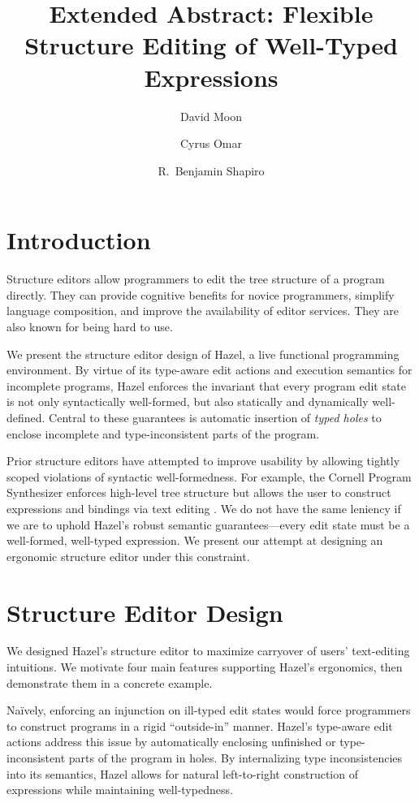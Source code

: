\documentclass[format=sigplan,dvipsnames,backend=bibtex]{acmart}
\title{Extended Abstract: Flexible Structure Editing of Well-Typed Expressions}
\author{David Moon}
\affiliation{University of Colorado Boulder}
\author{Cyrus Omar}
\affiliation{University of Chicago}
\author{R.~Benjamin Shapiro}
\affiliation{University of Colorado Boulder}
\newcommand{\Hazel}{\textsf{Hazel}\xspace}
\begin{document}
\maketitle

\section{Introduction}

Structure editors allow programmers to edit the tree structure of a program directly.
They can provide cognitive benefits for novice programmers, simplify language composition,
  and improve the availability of editor services.
They are also known for being hard to use.

We present the structure editor design of \Hazel, a live functional programming environment.
By virtue of its type-aware edit actions and execution semantics for incomplete programs, 
	\Hazel enforces the invariant that every program edit state is not only syntactically 
	well-formed, but also statically \cite{Hazelnut} and dynamically \cite{HazelnutLive}
	well-defined.
Central to these guarantees is automatic insertion of \emph{typed holes} to enclose
	incomplete and type-inconsistent parts of the program.
	
Prior structure editors have attempted to improve usability by allowing tightly scoped 
	violations of syntactic well-formedness.
For example, the Cornell Program Synthesizer enforces high-level tree structure but
	allows the user to construct expressions and bindings via text editing \cite{Cornell}.
We do not have the same leniency if we are to uphold \Hazel's robust semantic
	guarantees---every edit state must be a well-formed, well-typed expression.
We present our attempt at designing an ergonomic structure editor under this constraint.
	
\section{Structure Editor Design}

We designed \Hazel's structure
	editor to maximize carryover of users' text-editing intuitions.
We motivate four main features supporting \Hazel's ergonomics, then demonstrate them
	in a concrete example.

Naïvely, enforcing an injunction on ill-typed edit states would force programmers to
	construct programs in a rigid ``outside-in'' manner.
\Hazel's type-aware edit actions address this issue by automatically enclosing unfinished
	or type-inconsistent parts of the program in holes.
By internalizing type inconsistencies into its semantics, \Hazel allows for natural
	left-to-right construction of expressions while maintaining well-typedness.
\end{document}
